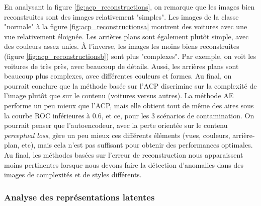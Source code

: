 En analysant la figure \ref{fig:acp_reconstructions}, on remarque que les images bien reconstruites sont des images relativement "simples". Les images de la classe "normale" à la figure \ref{fig:acp_reconstructionsa} montrent des voitures avec une vue relativement éloignée. Les arrières plans sont également plutôt simple, avec des couleurs assez unies. À l'inverse, les images les moins biens reconstruites (figure \ref{fig:acp_reconstructionsb}) sont plus "complexes". Par exemple, on voit les voitures de très près, avec beaucoup de détails. Aussi, les arrières plans sont beaucoup plus complexes, avec différentes couleurs et formes. Au final, on pourrait conclure que la méthode basée sur l'ACP discrimine sur la complexité de l'image plutôt que sur le contenu (voitures versus autres). La méthode AE performe un peu mieux que l'ACP, mais elle obtient tout de même des aires sous la courbe ROC inférieures à 0.6, et ce, pour les 3 scénarios de contamination. On pourrait penser que l'autoencodeur, avec la perte orientée sur le contenu \textit{perceptual loss}, gère un peu mieux ces différents éléments (vues, couleurs, arrière-plan, etc), mais cela n'est pas suffisant pour obtenir des performances optimales. Au final, les méthodes basées sur l'erreur de reconstruction nous apparaissent moins pertinentes lorsque nous devons faire la détection d'anomalies dans des images de complexités et de styles différents.
 

\subsubsection{Analyse des représentations latentes} \label{analyse_lat_cars}

